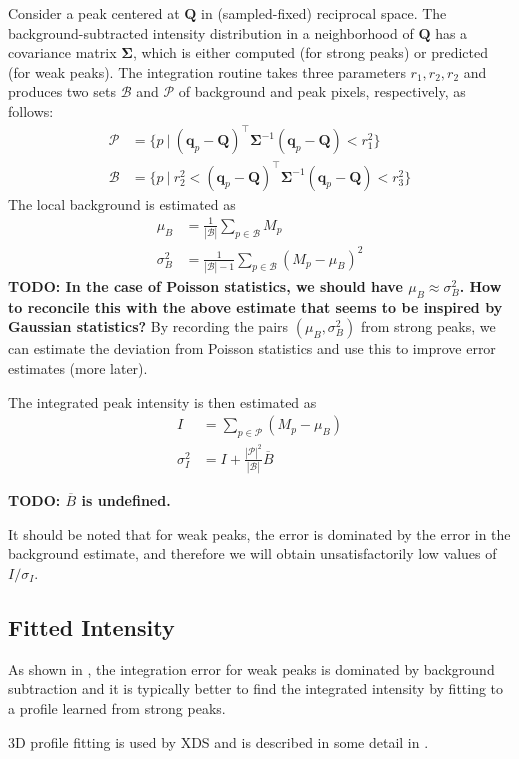 \documentclass[11pt,a4paper]{article}
\def\v#1{\bm{{#1}}}
\def\tr{^\intercal}
\def\calP{\mathcal{P}}
\def\calB{\mathcal{B}}
\def\q{{\v{q}}}
\begin{document}
Consider a peak centered at $\v{Q}$ in (sampled-fixed) reciprocal space. The background-subtracted intensity distribution in a neighborhood of $\v{Q}$ has a covariance matrix $\v\Sigma$, which is either computed (for strong peaks) or predicted (for weak peaks). The integration routine takes three parameters $r_1, r_2, r_2$ and produces
two sets $\calB$ and $\calP$ of background and peak pixels, respectively, as follows:
\begin{align}\label{EPeakPixels}
  \calP &= \{ p ~|~ (\q_p-\v{Q})\tr \v\Sigma^{-1} (\q_p-\v{Q}) < r_1^2 \} \\
  \calB &= \{ p ~|~ r_2^2 < (\q_p-\v{Q})\tr \v\Sigma^{-1} (\q_p-\v{Q}) < r_3^2 \}
\end{align}
The local background is estimated as
\begin{align}
  \mu_B &= \frac{1}{|\calB|} \sum_{p \in \calB} M_p \\
  \sigma^2_B &= \frac{1}{|\calB|-1} \sum_{p \in \calB} (M_p - \mu_B)^2
\end{align}
\textbf{TODO: In the case of Poisson statistics, we should have $\mu_B \approx \sigma^2_B$.
How to reconcile this with the above estimate that seems to be inspired by Gaussian statistics?}
By recording the pairs $(\mu_B, \sigma^2_B)$ from strong peaks,
we can estimate the deviation from Poisson statistics
and use this to improve error estimates (more later).

The integrated peak intensity is then estimated as
\begin{align}
  I &= \sum_{p \in \calP} (M_p - \mu_B) \\
  \sigma^2_I &= I + \frac{|\calP|^2}{|\calB|} \overline{B}
\end{align}

\textbf{TODO: $\overline{B}$ is undefined.}

It should be noted that for weak peaks, the error is dominated by the error in the background estimate, and therefore we will obtain unsatisfactorily low values of $I/\sigma_I$.


\subsection{Fitted Intensity}

As shown in \cite{Dia69}, the integration error for weak peaks is dominated by background subtraction
and it is typically better to find the integrated intensity by fitting to a profile learned from strong peaks.

3D profile fitting is used by XDS \cite{Kab10a}
and is described in some detail in \cite{Kab88b,Kab10b}.
\end{document}
